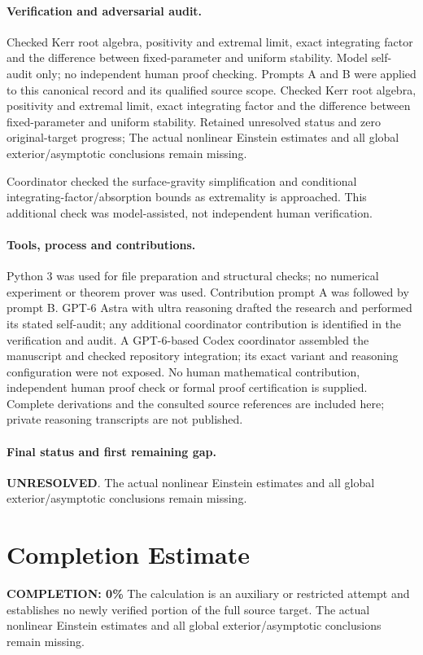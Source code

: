\documentclass[11pt]{article}
\begin{document}
\paragraph{Verification and adversarial audit.}
Checked Kerr root algebra, positivity and extremal limit, exact integrating factor and the difference between fixed-parameter and uniform stability. Model self-audit only; no independent human proof checking. Prompts A and B were applied to this canonical record and its qualified source scope. Checked Kerr root algebra, positivity and extremal limit, exact integrating factor and the difference between fixed-parameter and uniform stability. Retained unresolved status and zero original-target progress; The actual nonlinear Einstein estimates and all global exterior/asymptotic conclusions remain missing.

Coordinator checked the surface-gravity simplification and conditional integrating-factor/absorption bounds as extremality is approached. This additional check was model-assisted, not independent human verification.

\paragraph{Tools, process and contributions.}
Python 3 was used for file preparation and structural checks; no numerical experiment or theorem prover was used. Contribution prompt A was followed by prompt B. GPT-6 Astra with ultra reasoning drafted the research and performed its stated self-audit; any additional coordinator contribution is identified in the verification and audit. A GPT-6-based Codex coordinator assembled the manuscript and checked repository integration; its exact variant and reasoning configuration were not exposed. No human mathematical contribution, independent human proof check or formal proof certification is supplied. Complete derivations and the consulted source references are included here; private reasoning transcripts are not published.

\paragraph{Final status and first remaining gap.}
\textbf{UNRESOLVED}. The actual nonlinear Einstein estimates and all global exterior/asymptotic conclusions remain missing.

\section{Completion Estimate}
\noindent\textbf{COMPLETION: 0\%}
The calculation is an auxiliary or restricted attempt and establishes no newly verified portion of the full source target. The actual nonlinear Einstein estimates and all global exterior/asymptotic conclusions remain missing.
\end{document}
